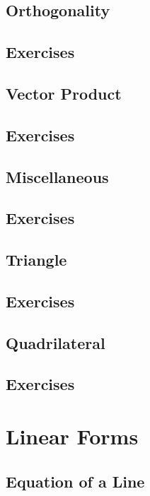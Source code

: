 \documentclass[journal,12pt,onecolumn]{IEEEtran}
\begin{document}
\subsection{Orthogonality}

\subsection{Exercises}

\subsection{Vector Product}

\subsection{Exercises}

\subsection{Miscellaneous}

\subsection{Exercises}

\subsection{Triangle}

\subsection{Exercises}

\subsection{ Quadrilateral}

\subsection{Exercises}

%
\section{Linear Forms}
\subsection{Equation of a Line}

\end{document}

